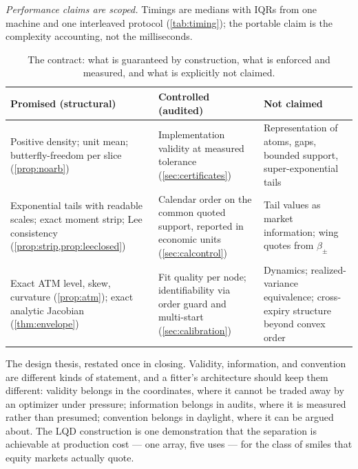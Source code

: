 \emph{Performance claims are scoped.}  Timings are medians with IQRs
from one machine and one interleaved protocol (\cref{tab:timing});
the portable claim is the complexity accounting, not the milliseconds.

\begin{table}[htbp]
\centering\small
\begin{tabular}{@{}p{}p{}p{}@{}}
\toprule
\textbf{Promised (structural)} & \textbf{Controlled (audited)} &
\textbf{Not claimed}\\
\midrule
Positive density; unit mean; butterfly-freedom per slice
(\cref{prop:noarb}) &
Implementation validity at measured tolerance
(\cref{sec:certificates}) &
Representation of atoms, gaps, bounded support, super-exponential
tails\\[4pt]
Exponential tails with readable scales; exact moment strip; Lee
consistency (\cref{prop:strip,prop:leeclosed}) &
Calendar order on the common quoted support, reported in economic
units (\cref{sec:calcontrol}) &
Tail values as market information; wing quotes from $\beta_\pm$\\[4pt]
Exact ATM level, skew, curvature (\cref{prop:atm}); exact analytic
Jacobian (\cref{thm:envelope}) &
Fit quality per node; identifiability via order guard and multi-start
(\cref{sec:calibration}) &
Dynamics; realized-variance equivalence; cross-expiry structure beyond
convex order\\
\bottomrule
\end{tabular}
\caption{The contract: what is guaranteed by construction, what is
enforced and measured, and what is explicitly not claimed.}
\label{tab:contract}
\end{table}

The design thesis, restated once in closing.  Validity, information,
and convention are different kinds of statement, and a fitter's
architecture should keep them different: validity belongs in the
coordinates, where it cannot be traded away by an optimizer under
pressure; information belongs in audits, where it is measured rather
than presumed; convention belongs in daylight, where it can be argued
about.  The LQD construction is one demonstration that the separation
is achievable at production cost --- one array, five uses --- for the
class of smiles that equity markets actually quote.
